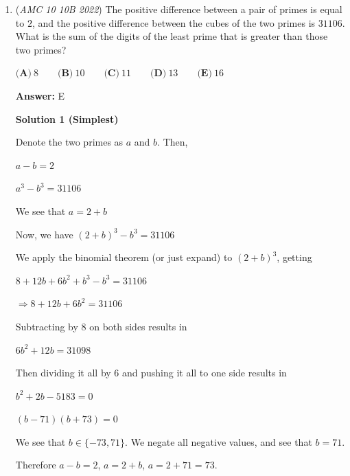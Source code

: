 \begin{enumerate}
 



\textbf{Solution 4 (Fakesolve)}

On each roll, there is a $\frac 16$ chance of rolling a sum of $7$. You would need $4$ of these rolls to get $4 \cdot \frac 16,$ which is larger than $\frac 12.$ Therefore, the answer is $\boxed {\textbf{(C) }4}.$

 Note: this solution is bogus, so do not attempt the problem this way on the actual test.

 


 


	\item (\textit{AMC 10 10B 2022}) The positive difference between a pair of primes is equal to $2$, and the positive difference between the cubes of the two primes is $31106$. What is the sum of the digits of the least prime that is greater than those two primes?


 $\textbf{(A)}\ 8 \qquad\textbf{(B)}\ 10 \qquad\textbf{(C)}\ 11 \qquad\textbf{(D)}\ 13 \qquad\textbf{(E)}\ 16$

 \textbf{Answer: }E



\textbf{Solution 1 (Simplest)}

Denote the two primes as \( a \) and \( b \). Then,

 \( a - b = 2 \)

 \( a^3 - b^3 = 31106 \)

 We see that \( a = 2 + b \)

 Now, we have \( (2+b)^3 - b^3 = 31106 \)

 We apply the binomial theorem (or just expand) to \( (2+b)^3 \), getting

 \( 8 + 12b + 6b^2 + b^3 - b^3 = 31106 \)

 \( \Rightarrow 8 + 12b + 6b^2 = 31106 \)

 Subtracting by 8 on both sides results in

 \( 6b^2 + 12b = 31098 \)

 Then dividing it all by 6 and pushing it all to one side results in

 \( b^2 + 2b - 5183 = 0\)

 \( (b-71)(b+73) = 0\)

 We see that \( b \in \{-73, 71\} \). We negate all negative values, and see that \( b = 71 \).

 Therefore \( a - b = 2 \), \( a = 2 + b \), \( a = 2 + 71 = 73 \).


\end{enumerate}
